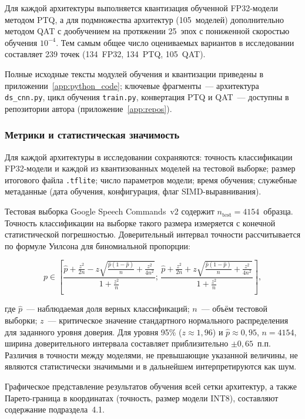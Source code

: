 Для каждой архитектуры выполняется квантизация обученной
FP32-модели методом PTQ, а для подмножества архитектур
(105~моделей) дополнительно методом QAT с дообучением на
протяжении 25~эпох с пониженной скоростью обучения $10^{-4}$.
Тем самым общее число оцениваемых вариантов в исследовании
составляет 239 точек (134~FP32, 134~PTQ, 105~QAT).

Полные исходные тексты модулей обучения и квантизации
приведены в приложении~\ref{app:python_code}; ключевые
фрагменты~--- архитектура \texttt{ds\_cnn.py}, цикл обучения
\texttt{train.py}, конвертация PTQ и QAT~--- доступны в
репозитории автора (приложение~\ref{app:repos}).

\subsubsection{Метрики и статистическая значимость}

Для каждой архитектуры в исследовании сохраняются: точность
классификации FP32-модели и каждой из квантизованных моделей
на тестовой выборке; размер итогового файла \texttt{.tflite};
число параметров модели; время обучения; служебные метаданные
(дата обучения, конфигурация, флаг SIMD-выравнивания).

Тестовая выборка Google Speech Commands~v2 содержит
$n_{\mathrm{test}} = 4154$~образца. Точность классификации на
выборке такого размера измеряется с конечной статистической
погрешностью. Доверительный интервал точности рассчитывается по
формуле Уилсона для биномиальной пропорции:

\begin{equation}
	p \in \left[
		\frac{\hat{p} + \frac{z^2}{2n} - z\sqrt{\frac{\hat{p}(1-\hat{p})}{n} + \frac{z^2}{4n^2}}}{1 + \frac{z^2}{n}};\,
		\frac{\hat{p} + \frac{z^2}{2n} + z\sqrt{\frac{\hat{p}(1-\hat{p})}{n} + \frac{z^2}{4n^2}}}{1 + \frac{z^2}{n}}
		\right],
	\label{eq:wilson}
\end{equation}

где $\hat{p}$~--- наблюдаемая доля верных классификаций;
$n$~--- объём тестовой выборки; $z$~--- критическое значение
стандартного нормального распределения для заданного уровня
доверия. Для уровня 95\% ($z \approx 1{,}96$) и
$\hat{p} \approx 0{,}95$, $n = 4154$, ширина доверительного
интервала составляет приблизительно $\pm 0{,}65$~п.п. Различия
в точности между моделями, не превышающие указанной величины,
не являются статистически значимыми и в дальнейшем
интерпретируются как шум.

Графическое представление результатов обучения всей сетки
архитектур, а также Парето-граница в координатах (точность,
размер модели INT8), составляют содержание подраздела~4.1.

